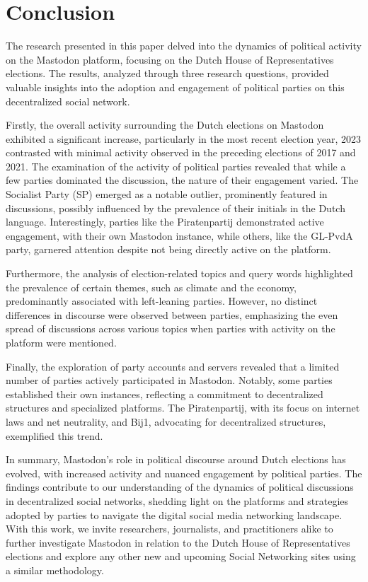 \section{Conclusion}


The research presented in this paper delved into the dynamics of political activity on the Mastodon platform, focusing on the Dutch House of Representatives elections. The results, analyzed through three research questions, provided valuable insights into the adoption and engagement of political parties on this decentralized social network.

Firstly, the overall activity surrounding the Dutch elections on Mastodon exhibited a significant increase, particularly in the most recent election year, 2023 contrasted with minimal activity observed in the preceding elections of 2017 and 2021. The examination of the activity of political parties revealed that while a few parties dominated the discussion, the nature of their engagement varied. The Socialist Party (SP) emerged as a notable outlier, prominently featured in discussions, possibly influenced by the prevalence of their initials in the Dutch language. Interestingly, parties like the Piratenpartij demonstrated active engagement, with their own Mastodon instance, while others, like the GL-PvdA party, garnered attention despite not being directly active on the platform.

Furthermore, the analysis of election-related topics and query words highlighted the prevalence of certain themes, such as climate and the economy, predominantly associated with left-leaning parties. However, no distinct differences in discourse were observed between parties, emphasizing the even spread of discussions across various topics when parties with activity on the platform were mentioned.

Finally, the exploration of party accounts and servers revealed that a limited number of parties actively participated in Mastodon. Notably, some parties established their own instances, reflecting a commitment to decentralized structures and specialized platforms. The Piratenpartij, with its focus on internet laws and net neutrality, and Bij1, advocating for decentralized structures, exemplified this trend.

In summary, Mastodon's role in political discourse around Dutch elections has evolved, with increased activity and nuanced engagement by political parties. The findings contribute to our understanding of the dynamics of political discussions in decentralized social networks, shedding light on the platforms and strategies adopted by parties to navigate the digital social media networking landscape. With this work, we invite researchers, journalists, and practitioners alike to further investigate Mastodon in relation to the Dutch House of Representatives elections and explore any other new and upcoming Social Networking sites using a similar methodology.